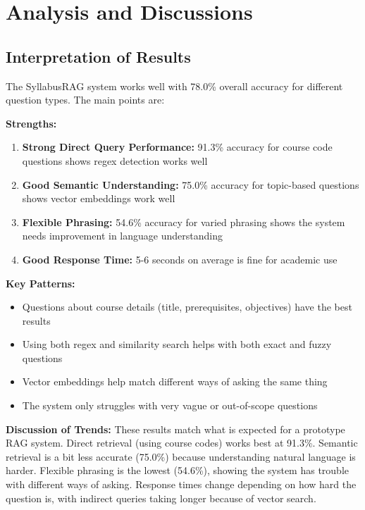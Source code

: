\documentclass[conference]{IEEEtran}
\begin{document}
\section{\textbf{Analysis and Discussions}}

\subsection{\textbf{Interpretation of Results}}

The SyllabusRAG system works well with 78.0\% overall accuracy for different question types. The main points are:

\textbf{Strengths:}
\begin{enumerate}
    \item \textbf{Strong Direct Query Performance:} 91.3\% accuracy for course code questions shows regex detection works well
    \item \textbf{Good Semantic Understanding:} 75.0\% accuracy for topic-based questions shows vector embeddings work well
    \item \textbf{Flexible Phrasing:} 54.6\% accuracy for varied phrasing shows the system needs improvement in language understanding
    \item \textbf{Good Response Time:} 5-6 seconds on average is fine for academic use
\end{enumerate}

\textbf{Key Patterns:}
\begin{itemize}
    \item Questions about course details (title, prerequisites, objectives) have the best results
    \item Using both regex and similarity search helps with both exact and fuzzy questions
    \item Vector embeddings help match different ways of asking the same thing
    \item The system only struggles with very vague or out-of-scope questions
\end{itemize}

\textbf{Discussion of Trends:}
These results match what is expected for a prototype RAG system. Direct retrieval (using course codes) works best at 91.3\%. Semantic retrieval is a bit less accurate (75.0\%) because understanding natural language is harder. Flexible phrasing is the lowest (54.6\%), showing the system has trouble with different ways of asking. Response times change depending on how hard the question is, with indirect queries taking longer because of vector search.
\end{document}
